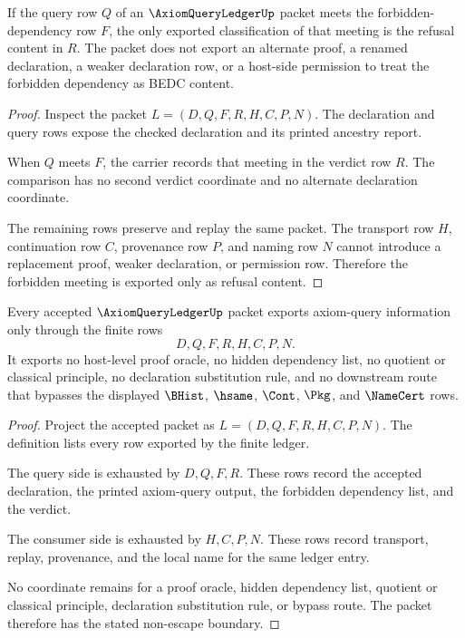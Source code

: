\begin{theorem}
\label{thm:axiom-query-ledger-refusal-boundary}
If the query row $Q$ of an $\AxiomQueryLedgerUp$ packet meets the forbidden-dependency row $F$, the only exported classification of that meeting is the refusal content in $R$. The packet does not export an alternate proof, a renamed declaration, a weaker declaration row, or a host-side permission to treat the forbidden dependency as BEDC content.
\end{theorem}
\begin{proof}
Inspect the packet $L=(D,Q,F,R,H,C,P,N)$. The declaration and query rows expose the checked declaration and its printed ancestry report.

When $Q$ meets $F$, the carrier records that meeting in the verdict row $R$. The comparison has no second verdict coordinate and no alternate declaration coordinate.

The remaining rows preserve and replay the same packet. The transport row $H$, continuation row $C$, provenance row $P$, and naming row $N$ cannot introduce a replacement proof, weaker declaration, or permission row. Therefore the forbidden meeting is exported only as refusal content.
\end{proof}

\begin{theorem}
\label{thm:axiom-query-ledger-nonescape}
Every accepted $\AxiomQueryLedgerUp$ packet exports axiom-query information only through the finite rows
$$
D,Q,F,R,H,C,P,N.
$$
It exports no host-level proof oracle, no hidden dependency list, no quotient or classical principle, no declaration substitution rule, and no downstream route that bypasses the displayed $\BHist$, $\hsame$, $\Cont$, $\Pkg$, and $\NameCert$ rows.
\end{theorem}
\begin{proof}
Project the accepted packet as $L=(D,Q,F,R,H,C,P,N)$. The definition lists every row exported by the finite ledger.

The query side is exhausted by $D,Q,F,R$. These rows record the accepted declaration, the printed axiom-query output, the forbidden dependency list, and the verdict.

The consumer side is exhausted by $H,C,P,N$. These rows record transport, replay, provenance, and the local name for the same ledger entry.

No coordinate remains for a proof oracle, hidden dependency list, quotient or classical principle, declaration substitution rule, or bypass route. The packet therefore has the stated non-escape boundary.
\end{proof}

